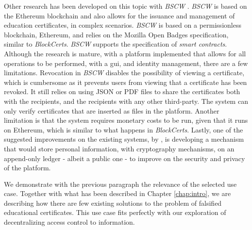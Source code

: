 Other research has been developed on this topic with \emph{BSCW} \cite{grather_blockchain_2018}. \emph{BSCW} is based on the Ethereum blockchain and also allows for the issuance and management of education certificates, in complex scenarios. \emph{BSCW} is based on a permissionless blockchain, Ethereum, and relies on the Mozilla Open Badges specification, similar to \emph{BlockCerts}. \emph{BSCW} supports the specification of \emph{smart contracts}. Although the research is mature, with a platform implemented that allows for all operations to be performed, with a \gls{gui}, and identity management, there are a few limitations. Revocation in \emph{BSCW} disables the possibility of viewing a certificate, which is cumbersome as it prevents users from viewing that a certificate has been revoked. It still relies on using JSON or PDF files to share the certificates both with the recipients, and the recipients with any other third-party. The system can only verify certificates that are inserted as files in the platform. Another limitation is that the system requires monetary costs to be run, given that it runs on Ethereum, which is similar to what happens in \emph{BlockCerts}. Lastly, one of the suggested improvements on the existing systems, by \cite{grather_blockchain_2018} \cite{grather_blockchain_2018}, is developing a mechanism that would store personal information, with cryptography mechanisms, on an append-only ledger - albeit a public one - to improve on the security and privacy of the platform.

We demonstrate with the previous paragraph the relevance of the selected use case. Together with what has been described in Chapter \ref{chap:intro}, we are describing how there are few existing solutions to the problem of falsified educational certificates. This use case fits perfectly with our exploration of decentralizing access control to information.